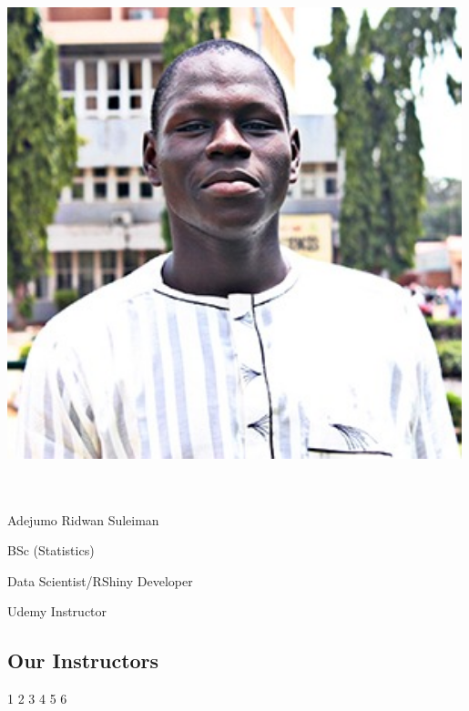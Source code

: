 \documentclass[
  letterpaper,
  DIV=11,
  numbers=noendperiod]{scrartcl}
\begin{document}
\includegraphics[width=5.19792in,height=5.97917in]{images/ridwan.jpeg}

Adejumo Ridwan Suleiman

BSc (Statistics)

Data Scientist/RShiny Developer

Udemy Instructor

\hypertarget{our-instructors-3}{%
\subsection{Our Instructors}\label{our-instructors-3}}

{1} 2 {3 4 5 6}
\end{document}
